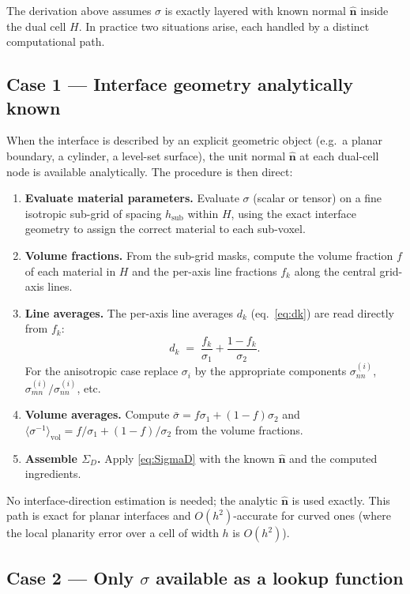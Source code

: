 \documentclass[11pt]{article}
\newcommand{\nn}{\hat{\bm{n}}}
\newcommand{\SD}{\Sigma_D}
\newcommand{\sbar}{\bar{\sigma}}
\newcommand{\invs}{\langle\sigma^{-1}\rangle_{\mathrm{vol}}}
\begin{document}
The derivation above assumes $\sigma$ is exactly layered with known normal
$\nn$ inside the dual cell $H$.  In practice two situations arise, each handled
by a distinct computational path.

\subsection{Case 1 — Interface geometry analytically known}\label{sec:exact_n}

When the interface is described by an explicit geometric object (e.g.\ a
planar boundary, a cylinder, a level-set surface), the unit normal $\nn$ at
each dual-cell node is available analytically.  The procedure is then direct:

\begin{enumerate}
\item \textbf{Evaluate material parameters.}  Evaluate $\sigma$ (scalar or
tensor) on a fine isotropic sub-grid of spacing $h_\mathrm{sub}$ within $H$,
using the exact interface geometry to assign the correct material to each
sub-voxel.
\item \textbf{Volume fractions.}  From the sub-grid masks, compute the
volume fraction $f$ of each material in $H$ and the per-axis line fractions
$f_k$ along the central grid-axis lines.
\item \textbf{Line averages.}  The per-axis line averages $d_k$
(eq.\ \eqref{eq:dk}) are read directly from $f_k$:
\[
  d_k \;=\; \frac{f_k}{\sigma_1} + \frac{1-f_k}{\sigma_2}.
\]
For the anisotropic case replace $\sigma_i$ by the appropriate components
$\sigma_{nn}^{(i)}$, $\sigma_{mn}^{(i)}/\sigma_{nn}^{(i)}$, etc.
\item \textbf{Volume averages.}  Compute $\sbar = f\sigma_1 + (1-f)\sigma_2$
and $\invs = f/\sigma_1 + (1-f)/\sigma_2$ from the volume fractions.
\item \textbf{Assemble $\SD$.}  Apply \eqref{eq:SigmaD} with the known $\nn$
and the computed ingredients.
\end{enumerate}

No interface-direction estimation is needed; the analytic $\nn$ is used
exactly.  This path is exact for planar interfaces and $O(h^2)$-accurate
for curved ones (where the local planarity error over a cell of width $h$
is $O(h^2)$).

\subsection{Case 2 — Only $\sigma$ available as a lookup function}
\label{sec:sigma_func}
\end{document}
